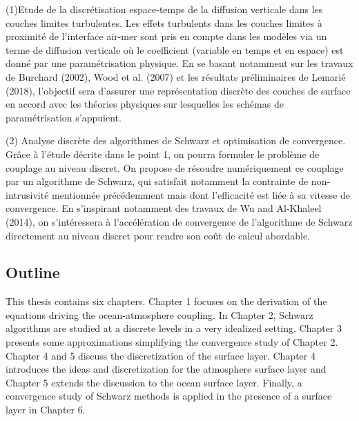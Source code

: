 (1)Etude de la discrétisation espace-temps de la diffusion verticale dans les couches
limites turbulentes. Les effets turbulents dans les couches limites à proximité de l’interface
air-mer sont pris en compte dans les modèles via un terme de diffusion verticale où le coefficient
(variable en temps et en espace) est donné par une paramétrisation physique. En se basant
notamment sur les travaux de Burchard (2002), Wood et al. (2007) et les résultats préliminaires
de Lemarié (2018), l’objectif sera d’assurer une représentation discrète des couches de surface
en accord avec les théories physiques sur lesquelles les schémas de paramétrisation s’appuient.
\par
(2) Analyse discrète des algorithmes de Schwarz et optimisation de convergence. Grâce
à l’étude décrite dans le point 1, on pourra formuler le problème de couplage au niveau discret.
On propose de résoudre numériquement ce couplage par un algorithme de Schwarz, qui satisfait
notamment la contrainte de non-intrusivité mentionnée précédemment mais dont l’efficacité est
liée à sa vitesse de convergence. En s’inspirant notamment des travaux de Wu and Al-Khaleel
(2014), on s’intéressera à l’accélération de convergence de l’algorithme de Schwarz directement
au niveau discret pour rendre son coût de calcul abordable.
\subsection*{Outline}
This thesis contains six chapters.
Chapter 1 focuses on the derivation of the equations
driving the ocean-atmosphere coupling.
In Chapter 2, Schwarz algorithms are studied at a discrete
levels in a very idealized setting.
Chapter 3 presents some approximations simplifying the
convergence study of Chapter 2.
Chapter 4 and 5 discuss the discretization of the
surface layer. Chapter 4 introduces the ideas and discretization
for the atmosphere surface layer and Chapter 5 extends the
discussion to the ocean surface layer.
Finally, a convergence study of Schwarz methods is applied
in the presence of a surface layer in Chapter 6.

